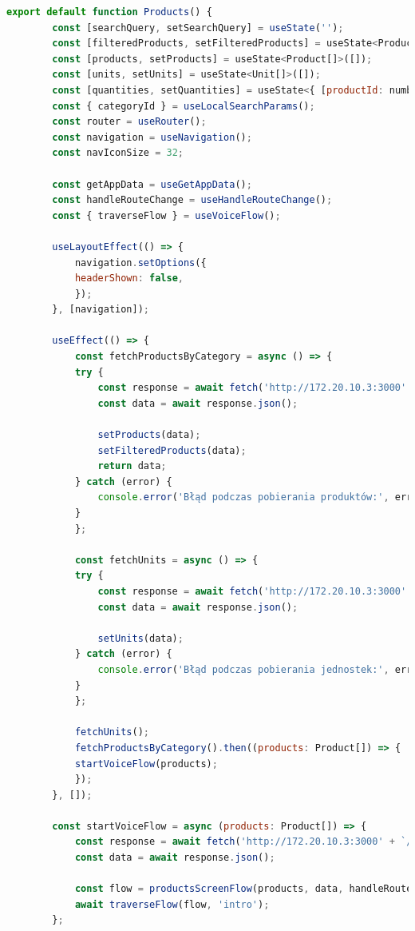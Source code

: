 \begin{lstlisting}[language=JavaScript, caption=Ekran produktów implementacja, label=lst:service]
    export default function Products() {
        const [searchQuery, setSearchQuery] = useState('');
        const [filteredProducts, setFilteredProducts] = useState<Product[]>([]);
        const [products, setProducts] = useState<Product[]>([]);
        const [units, setUnits] = useState<Unit[]>([]);
        const [quantities, setQuantities] = useState<{ [productId: number]: number }>({});
        const { categoryId } = useLocalSearchParams();
        const router = useRouter();
        const navigation = useNavigation();
        const navIconSize = 32;

        const getAppData = useGetAppData();
        const handleRouteChange = useHandleRouteChange();
        const { traverseFlow } = useVoiceFlow();

        useLayoutEffect(() => {
            navigation.setOptions({
            headerShown: false,
            });
        }, [navigation]);

        useEffect(() => {
            const fetchProductsByCategory = async () => {
            try {
                const response = await fetch('http://172.20.10.3:3000' + `/products/category/${categoryId}`);
                const data = await response.json();

                setProducts(data);
                setFilteredProducts(data);
                return data;
            } catch (error) {
                console.error('Błąd podczas pobierania produktów:', error);
            }
            };

            const fetchUnits = async () => {
            try {
                const response = await fetch('http://172.20.10.3:3000' + `/units`);
                const data = await response.json();

                setUnits(data);
            } catch (error) {
                console.error('Błąd podczas pobierania jednostek:', error);
            }
            };

            fetchUnits();
            fetchProductsByCategory().then((products: Product[]) => {
            startVoiceFlow(products);
            });
        }, []);

        const startVoiceFlow = async (products: Product[]) => {
            const response = await fetch('http://172.20.10.3:3000' + `/units`);
            const data = await response.json();

            const flow = productsScreenFlow(products, data, handleRouteChange, addToCartCommand);
            await traverseFlow(flow, 'intro');
        };


\end{lstlisting}
